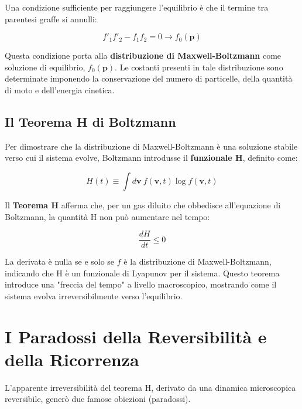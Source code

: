 Una condizione sufficiente per raggiungere l'equilibrio è che il termine tra parentesi graffe si annulli:

\begin{equation}
f'_{1}f'_{2}-f_{1}f_{2}=0 \rightarrow f_0(\mathbf{p})
\end{equation}

Questa condizione porta alla \textbf{distribuzione di Maxwell-Boltzmann} come soluzione di equilibrio, $f_0(\mathbf{p})$. Le costanti presenti in tale distribuzione sono determinate imponendo la conservazione del numero di particelle, della quantità di moto e dell'energia cinetica.

\subsection{Il Teorema H di Boltzmann}
Per dimostrare che la distribuzione di Maxwell-Boltzmann è una soluzione stabile verso cui il sistema evolve, Boltzmann introdusse il \textbf{funzionale H}, definito come:

\begin{equation}
H(t)\equiv\int d\mathbf{v}~f(\mathbf{v},t)\log f(\mathbf{v},t)
\end{equation}

Il \textbf{Teorema H} afferma che, per un gas diluito che obbedisce all'equazione di Boltzmann, la quantità H non può aumentare nel tempo:

\begin{equation}
\frac{dH}{dt} \le 0
\end{equation}

La derivata è nulla se e solo se $f$ è la distribuzione di Maxwell-Boltzmann, indicando che H è un funzionale di Lyapunov per il sistema. Questo teorema introduce una "freccia del tempo" a livello macroscopico, mostrando come il sistema evolva irreversibilmente verso l'equilibrio.

\section{I Paradossi della Reversibilità e della Ricorrenza}

L'apparente irreversibilità del teorema H, derivato da una dinamica microscopica reversibile, generò due famose obiezioni (paradossi).

